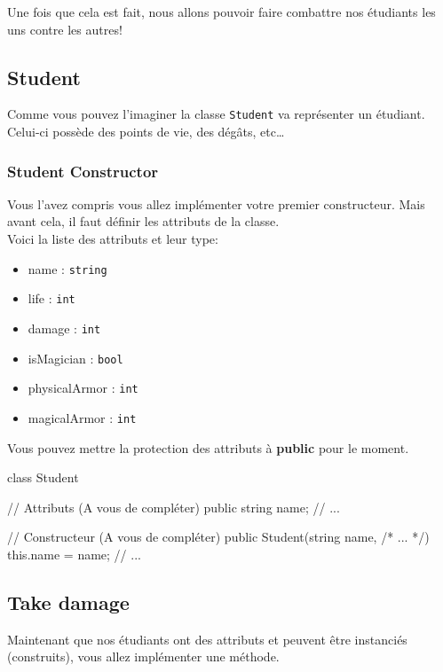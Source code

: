 Une fois que cela est fait, nous allons pouvoir faire combattre nos étudiants les uns
contre les autres!

\subsection{Student}

Comme vous pouvez l'imaginer la classe \texttt{Student} va représenter un étudiant.
Celui-ci possède des points de vie, des dégâts, etc\ldots

\subsubsection{Student Constructor}

Vous l'avez compris vous allez implémenter votre premier constructeur. 
Mais avant cela, il faut définir les attributs de la classe.\\

Voici la liste des attributs et leur type:

\begin{itemize}
\item name : \texttt{string}
\item life : \texttt{int}
\item damage : \texttt{int}
\item isMagician : \texttt{bool}
\item physicalArmor : \texttt{int}
\item magicalArmor : \texttt{int}\\
\end{itemize}

Vous pouvez mettre la protection des attributs à \textbf{public} pour le moment.

\begin{code}
class Student
{
	// Attributs (A vous de compléter)
    public string name;
    // ...
    
    // Constructeur (A vous de compléter)
    public Student(string name, /* ... */)
    {
    	this.name = name;
        // ...
    }
}
\end{code}

\subsection{Take damage}

Maintenant que nos étudiants ont des attributs et peuvent être instanciés (construits), vous allez implémenter une méthode. 

